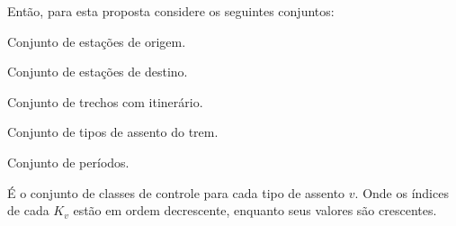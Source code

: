 
Então, para esta proposta considere os seguintes conjuntos:

\begin{description}[style=unboxed, leftmargin=2.5cm, labelindent=1.5cm]
	\setlength{\itemsep}{-2.2em} %
	\setlength{\parskip}{0em} %
	\item[$O:$] Conjunto de estações de origem. \\
	\item[$D:$] Conjunto de estações de destino. \\
	\item[$OD:$] Conjunto de trechos com itinerário. \\
	\item[$V:$] Conjunto de tipos de assento do trem. \\
	\item[$T:$] Conjunto de períodos. \\
	\item[$K_v:$] É o conjunto de classes de controle para cada tipo de assento $v$. Onde os índices de cada $K_v$ estão em ordem decrescente, enquanto seus valores são crescentes.
\end{description}


